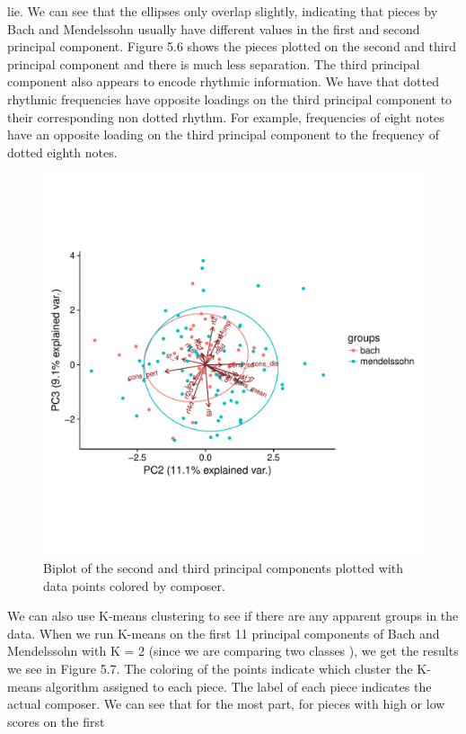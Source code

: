 \documentclass[12pt,twoside]{reedthesis}
\theoremstyle{definition}
\theoremstyle{definition}
\theoremstyle{definition}
\theoremstyle{remark}
\begin{document}
lie. We can see that the ellipses only overlap slightly, indicating that
pieces by Bach and Mendelssohn usually have different values in the
first and second principal component. Figure 5.6 shows the pieces
plotted on the second and third principal component and there is much
less separation. The third principal component also appears to encode
rhythmic information. We have that dotted rhythmic frequencies have
opposite loadings on the third principal component to their
corresponding non dotted rhythm. For example, frequencies of eight notes
have an opposite loading on the third principal component to the
frequency of dotted eighth notes.
\begin{figure}[H]
\centering
\includegraphics[scale = .7]{images/bi_elipse23.pdf}
\caption{Biplot of the second and third principal components plotted with data points colored by composer.}
\label{subd}
\end{figure}
We can also use K-means clustering to see if there are any apparent
groups in the data. When we run K-means on the first 11 principal
components of Bach and Mendelssohn with K = 2 (since we are comparing
two classes ), we get the results we see in Figure 5.7. The coloring of
the points indicate which cluster the K-means algorithm assigned to each
piece. The label of each piece indicates the actual composer. We can see
that for the most part, for pieces with high or low scores on the first
\end{document}
